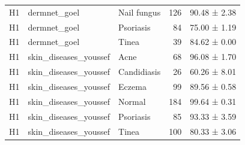 \begin{tabular}{lllrl}
H1 & dermnet\_goel & Nail fungus & 126 & 90.48 ± 2.38 \\
H1 & dermnet\_goel & Psoriasis & 84 & 75.00 ± 1.19 \\
H1 & dermnet\_goel & Tinea & 39 & 84.62 ± 0.00 \\
H1 & skin\_diseases\_youssef & Acne & 68 & 96.08 ± 1.70 \\
H1 & skin\_diseases\_youssef & Candidiasis & 26 & 60.26 ± 8.01 \\
H1 & skin\_diseases\_youssef & Eczema & 99 & 89.56 ± 0.58 \\
H1 & skin\_diseases\_youssef & Normal & 184 & 99.64 ± 0.31 \\
H1 & skin\_diseases\_youssef & Psoriasis & 85 & 93.33 ± 3.59 \\
H1 & skin\_diseases\_youssef & Tinea & 100 & 80.33 ± 3.06 \\
\bottomrule
\end{tabular}
